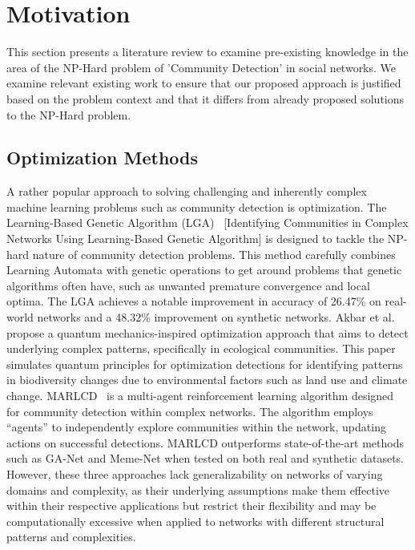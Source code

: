 \documentclass{article}
\begin{document}
\section{Motivation}
This section presents a literature review to examine pre-existing knowledge in the area of the NP-Hard problem of 'Community Detection' in social networks. We examine relevant existing work to ensure that our proposed approach is justified based on the problem context and that it differs from already proposed solutions to the NP-Hard problem.

\subsection{Optimization Methods}
A rather popular approach to solving challenging and inherently complex machine learning problems such as community detection is optimization. The Learning-Based Genetic Algorithm (LGA)~\cite{ABDI2024103031} [Identifying Communities in Complex Networks Using Learning-Based Genetic Algorithm] is designed to tackle the NP-hard nature of community detection problems. This method carefully combines Learning Automata with genetic operations to get around problems that genetic algorithms often have, such as unwanted premature convergence and local optima. The LGA achieves a notable improvement in accuracy of 26.47\% on real-world networks and a 48.32\% improvement on synthetic networks. Akbar et al.~\cite{Akbar2021} propose a quantum mechanics-inspired optimization approach that aims to detect underlying complex patterns, specifically in ecological communities. This paper simulates quantum principles for optimization detections for identifying patterns in biodiversity changes due to environmental factors such as land use and climate change. MARLCD~\cite{Alipour} is a multi-agent reinforcement learning algorithm designed for community detection within complex networks. The algorithm employs “agents” to independently explore communities within the network, updating actions on successful detections. MARLCD outperforms state-of-the-art methods such as GA-Net and Meme-Net when tested on both real and synthetic datasets. However, these three approaches lack generalizability on networks of varying domains and complexity, as their underlying assumptions make them effective within their respective applications but restrict their flexibility and may be computationally excessive when applied to networks with different structural patterns and complexities.
\end{document}
